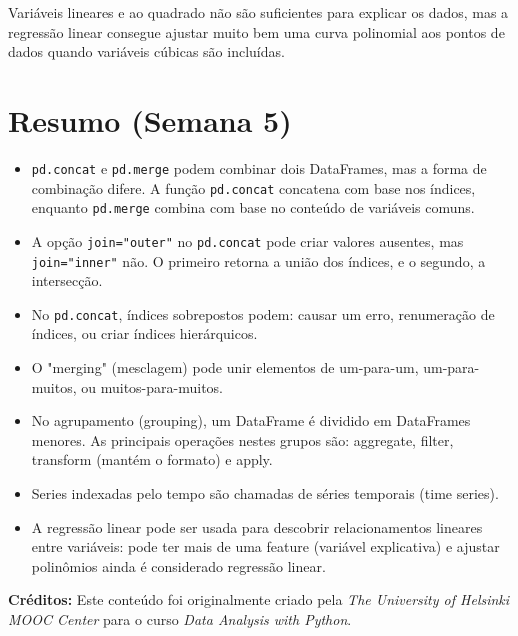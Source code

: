 \documentclass[11pt,a4paper]{article}
\begin{document}
Variáveis lineares e ao quadrado não são suficientes para explicar os dados, mas a regressão linear consegue ajustar muito bem uma curva polinomial aos pontos de dados quando variáveis cúbicas são incluídas.

\section{Resumo (Semana 5)}
\begin{itemize}
    \item \texttt{pd.concat} e \texttt{pd.merge} podem combinar dois DataFrames, mas a forma de combinação difere. A função \texttt{pd.concat} concatena com base nos índices, enquanto \texttt{pd.merge} combina com base no conteúdo de variáveis comuns.
    \item A opção \texttt{join="outer"} no \texttt{pd.concat} pode criar valores ausentes, mas \texttt{join="inner"} não. O primeiro retorna a união dos índices, e o segundo, a intersecção.
    \item No \texttt{pd.concat}, índices sobrepostos podem: causar um erro, renumeração de índices, ou criar índices hierárquicos.
    \item O "merging" (mesclagem) pode unir elementos de um-para-um, um-para-muitos, ou muitos-para-muitos.
    \item No agrupamento (grouping), um DataFrame é dividido em DataFrames menores. As principais operações nestes grupos são: aggregate, filter, transform (mantém o formato) e apply.
    \item Series indexadas pelo tempo são chamadas de séries temporais (time series).
    \item A regressão linear pode ser usada para descobrir relacionamentos lineares entre variáveis: pode ter mais de uma feature (variável explicativa) e ajustar polinômios ainda é considerado regressão linear.
\end{itemize}

\vspace{2em}
\noindent\textbf{Créditos:} Este conteúdo foi originalmente criado pela \textit{The University of Helsinki MOOC Center} para o curso \textit{Data Analysis with Python}.
\end{document}
